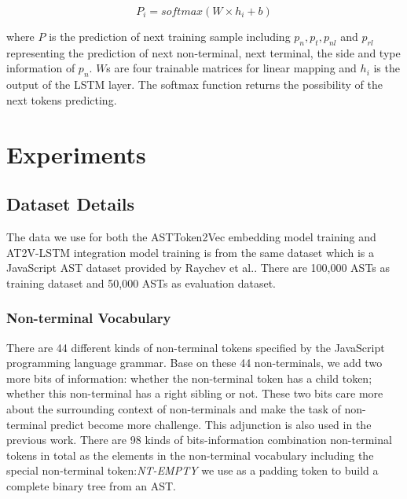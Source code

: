 \documentclass[T, E]{compsoft}
\begin{document}
\begin{equation}
P_{i} = softmax(W \times h_{i} + b)
\end{equation}


where $P$ is the prediction of next training sample including $p_{n}, p_{t}, p_{nl}$ and $p_{rl}$ representing the prediction of next non-terminal, next terminal, the side and type information of $p_{n}$. 
$W$s are four trainable matrices for linear mapping and $h_{i}$ is the output of the LSTM layer.
The softmax function returns the possibility of the next tokens predicting.
 




\section{Experiments}
\label{section:experiment}
\subsection{Dataset Details}
The data we use for both the ASTToken2Vec embedding model training and AT2V-LSTM integration model training is from the same dataset which is a JavaScript AST dataset provided by Raychev et al.\cite{dataset}. 
There are 100,000 ASTs as training dataset and 50,000 ASTs as evaluation dataset. 

\subsubsection{Non-terminal Vocabulary} 
There are 44 different kinds of non-terminal tokens specified by the JavaScript programming language grammar. 
Base on these 44 non-terminals, we add two more bits of information: whether the non-terminal token has a child token; whether this non-terminal has a right sibling or not. 
These two bits care more about the surrounding context of non-terminals and make the task of non-terminal predict become more challenge. 
This adjunction is also used in the previous work\cite{liu2016neural}\cite{dataset}. 
There are 98 kinds of bits-information combination non-terminal tokens in total as the elements in the non-terminal vocabulary including the special non-terminal token:\textit{NT-EMPTY} we use as a padding token to build a complete binary tree from an AST.
\end{document}
